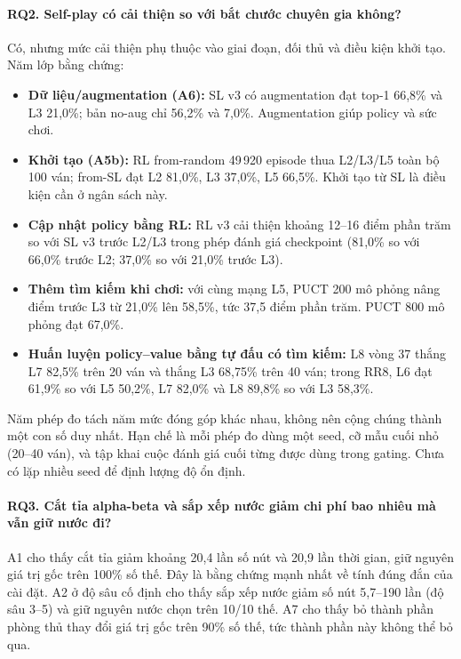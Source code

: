 \paragraph{RQ2. Self-play có cải thiện so với bắt chước chuyên gia không?}
Có, nhưng mức cải thiện phụ thuộc vào giai đoạn, đối thủ và điều kiện khởi tạo. Năm lớp bằng
chứng:
\begin{itemize}
  \item \textbf{Dữ liệu/augmentation (A6):} SL v3 có augmentation đạt top-1 66,8\% và L3 21,0\%;
        bản no-aug chỉ 56,2\% và 7,0\%. Augmentation giúp policy và sức chơi.
  \item \textbf{Khởi tạo (A5b):} RL from-random 49\,920 episode thua L2/L3/L5 toàn bộ 100 ván;
        from-SL đạt L2 81,0\%, L3 37,0\%, L5 66,5\%. Khởi tạo từ SL là điều kiện cần ở ngân sách
        này.
  \item \textbf{Cập nhật policy bằng RL:} RL v3 cải thiện khoảng 12--16 điểm phần trăm so với
        SL v3 trước L2/L3 trong phép đánh giá checkpoint (81,0\% so với 66,0\% trước L2; 37,0\%
        so với 21,0\% trước L3).
  \item \textbf{Thêm tìm kiếm khi chơi:} với cùng mạng L5, PUCT 200 mô phỏng nâng điểm trước L3
        từ 21,0\% lên 58,5\%, tức 37,5 điểm phần trăm. PUCT 800 mô phỏng đạt 67,0\%.
  \item \textbf{Huấn luyện policy--value bằng tự đấu có tìm kiếm:} L8 vòng 37 thắng L7 82,5\%
        trên 20 ván và thắng L3 68,75\% trên 40 ván; trong RR8, L6 đạt 61,9\% so với L5 50,2\%,
        L7 82,0\% và L8 89,8\% so với L3 58,3\%.
\end{itemize}
Năm phép đo tách năm mức đóng góp khác nhau, không nên cộng chúng thành một con số duy nhất.
Hạn chế là mỗi phép đo dùng một seed, cỡ mẫu cuối nhỏ (20--40 ván), và tập khai cuộc đánh giá
cuối từng được dùng trong gating. Chưa có lặp nhiều seed để định lượng độ ổn định.

\paragraph{RQ3. Cắt tỉa alpha-beta và sắp xếp nước giảm chi phí bao nhiêu mà vẫn giữ nước đi?}
A1 cho thấy cắt tỉa giảm khoảng 20,4 lần số nút và 20,9 lần thời gian, giữ nguyên giá trị gốc
trên 100\% số thế. Đây là bằng chứng mạnh nhất về tính đúng đắn của cài đặt. A2 ở độ sâu cố định cho
thấy sắp xếp nước giảm số nút 5,7--190 lần (độ sâu 3--5) và giữ nguyên nước chọn trên 10/10 thế. A7 cho thấy bỏ thành phần phòng thủ thay đổi giá trị
gốc trên 90\% số thế, tức thành phần này không thể bỏ qua.

